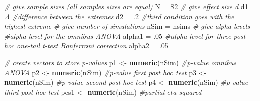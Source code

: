 \documentclass[
]{book}
\newenvironment{Shaded}{\begin{snugshade}}{\end{snugshade}}
\newcommand{\CommentTok}[1]{\textcolor[rgb]{0.56,0.35,0.01}{\textit{#1}}}
\newcommand{\DecValTok}[1]{\textcolor[rgb]{0.00,0.00,0.81}{#1}}
\newcommand{\FloatTok}[1]{\textcolor[rgb]{0.00,0.00,0.81}{#1}}
\newcommand{\KeywordTok}[1]{\textcolor[rgb]{0.13,0.29,0.53}{\textbf{#1}}}
\newcommand{\NormalTok}[1]{#1}
\newcommand{\StringTok}[1]{\textcolor[rgb]{0.31,0.60,0.02}{#1}}
\begin{document}
\begin{Shaded}
\begin{Highlighting}[]
\CommentTok{# give sample sizes (all samples sizes are equal)}
\NormalTok{N =}\StringTok{ }\DecValTok{82}
\CommentTok{# give effect size d}
\NormalTok{d1 =}\StringTok{ }\FloatTok{.4} \CommentTok{#difference between the extremes}
\NormalTok{d2 =}\StringTok{ }\FloatTok{.2} \CommentTok{#third condition goes with the highest extreme}
\CommentTok{# give number of simulations}
\NormalTok{nSim =}\StringTok{ }\NormalTok{nsims}
\CommentTok{# give alpha levels}
\CommentTok{#alpha level for the omnibus ANOVA}
\NormalTok{alpha1 =}\StringTok{ }\FloatTok{.05} 
\CommentTok{#alpha level for three post hoc one-tail t-test Bonferroni correction}
\NormalTok{alpha2 =}\StringTok{ }\FloatTok{.05} 
\end{Highlighting}
\end{Shaded}

\begin{Shaded}
\begin{Highlighting}[]
\CommentTok{# create vectors to store p-values}
\NormalTok{p1 <-}\StringTok{ }\KeywordTok{numeric}\NormalTok{(nSim) }\CommentTok{#p-value omnibus ANOVA}
\NormalTok{p2 <-}\StringTok{ }\KeywordTok{numeric}\NormalTok{(nSim) }\CommentTok{#p-value first post hoc test}
\NormalTok{p3 <-}\StringTok{ }\KeywordTok{numeric}\NormalTok{(nSim) }\CommentTok{#p-value second post hoc test}
\NormalTok{p4 <-}\StringTok{ }\KeywordTok{numeric}\NormalTok{(nSim) }\CommentTok{#p-value third post hoc test}
\NormalTok{pes1 <-}\StringTok{ }\KeywordTok{numeric}\NormalTok{(nSim) }\CommentTok{#partial eta-squared}
\end{Highlighting}
\end{Shaded}
\end{document}
